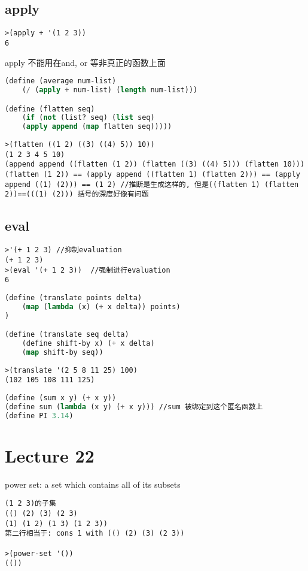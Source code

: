 \documentclass{article}
\begin{document}
\subsection{apply}
\begin{verbatim}
>(apply + '(1 2 3))
6
\end{verbatim}apply 不能用在and, or 等非真正的函数上面

\begin{lstlisting}[language = Lisp]
(define (average num-list)
	(/ (apply + num-list) (length num-list)))

(define (flatten seq)
	(if (not (list? seq) (list seq)
	(apply append (map flatten seq)))))
\end{lstlisting}

\begin{verbatim}
>(flatten ((1 2) ((3) ((4) 5)) 10))
(1 2 3 4 5 10)
(append append ((flatten (1 2)) (flatten ((3) ((4) 5))) (flatten 10)))
(flatten (1 2)) == (apply append ((flatten 1) (flatten 2))) == (apply append ((1) (2))) == (1 2) //推断是生成这样的, 但是((flatten 1) (flatten 2))==(((1) (2))) 括号的深度好像有问题
\end{verbatim}

\subsection{eval}
\begin{verbatim}
>'(+ 1 2 3) //抑制evaluation
(+ 1 2 3)
>(eval '(+ 1 2 3))  //强制进行evaluation
6
\end{verbatim}

\begin{lstlisting}[language = Lisp]
(define (translate points delta)
	(map (lambda (x) (+ x delta)) points)
)

(define (translate seq delta)
	(define shift-by x) (+ x delta)
	(map shift-by seq))
\end{lstlisting}

\begin{verbatim}
>(translate '(2 5 8 11 25) 100)
(102 105 108 111 125)
\end{verbatim}

\begin{lstlisting}[language = Lisp]
(define (sum x y) (+ x y))
(define sum (lambda (x y) (+ x y))) //sum 被绑定到这个匿名函数上
(define PI 3.14)
\end{lstlisting}

\section{Lecture 22}
power set: a set which contains all of its subsets
\begin{verbatim}
(1 2 3)的子集
(() (2) (3) (2 3)
(1) (1 2) (1 3) (1 2 3))
第二行相当于: cons 1 with (() (2) (3) (2 3))

>(power-set '())
(())
\end{verbatim}
\end{document}
